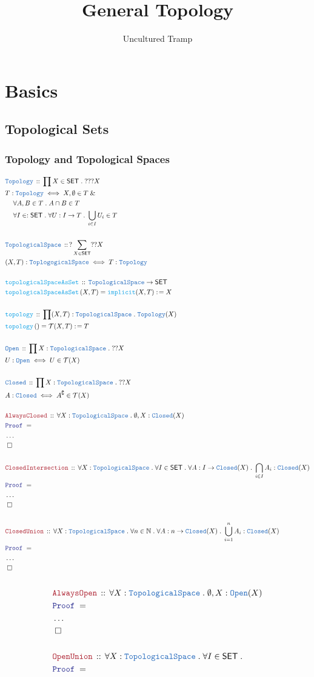 \documentclass[12pt]{scrartcl}
\author{Uncultured Tramp}
\title{General Topology}
\newcommand{\TYPE}[1]{\textcolor{NavyBlue}{\mathtt{#1}}}
\newcommand{\FUNC}[1]{\textcolor{Cerulean}{\mathtt{#1}}}
\newcommand{\LOGIC}[1]{\textcolor{Blue}{\mathtt{#1}}}
\newcommand{\THM}[1]{\textcolor{Maroon}{\mathtt{#1}}}
\renewcommand{\.}{\; . \;}
\newcommand{\de}{: \kern 0.1pc =}
\newcommand{\Act}[1]{\left( #1 \right)}
\newcommand{\Theorem}[2]{& \THM{#1} \, :: \, #2 \\ & \Proof = \\ }
\newcommand{\DeclareType}[2]{& \TYPE{#1} \, :: \, #2 \\}
\newcommand{\DefineType}[3]{& #1 : \TYPE{#2} \iff #3 \\}
\newcommand{\DeclareFunc}[2]{& \FUNC{#1} \, :: \, #2 \\}
\newcommand{\DefineNamedFunc}[4]{&  \FUNC{#1}\Act{#2} = #3 \de #4 \\}
\newcommand{\NewLine}{\\ & \kern 1pc}
\newcommand{\Page}[1]{ \begin{align*} #1 \end{align*}   }
\newcommand{\NoProof}{ & \ldots \\ \EndProof}
\renewcommand{\And}{\; \& \;}
\newcommand{\Nat}{\mathbb{N} }
\renewcommand{\c}{\complement}
\newcommand{\QED}{\; \square}
\newcommand{\EndProof}{& \QED \\}
\newcommand{\Proof}{\LOGIC{Proof} \; }
\newcommand{\SET}{\mathsf{SET}}
\newcommand{\TS}{\TYPE{TopologicalSpace}}
\newcommand{\T}{\mathcal{T}}
\begin{document}
\maketitle
\newpage
\tableofcontents
\newpage
\section{Basics}
\subsection{Topological Sets}
\subsubsection{Topology and Topological Spaces}
\Page{
	\DeclareType{Topology}
	{ \prod X \in \SET \. ???X }
	\DefineType{T}{Topology}{
		X, \emptyset \in T \And \NewLine
		\forall A,B \in T \. A \cap B \in T \NewLine
		\forall I \in :\SET \. \forall U : I \to T \. \bigcup_{i \in I} U_i \in T	}
	\\
	\DeclareType{TopologicalSpace}
	{
		?\sum_{X \in \SET} ??X
	}
	\DefineType{(X,T)}{ToplogogicalSpace}
	{
		T : \TYPE{Topology}
	}
	\\
	\DeclareFunc{topologicalSpaceAsSet}
	{
		\TS \to \SET           	
	}
	\DefineNamedFunc{topologicalSpaceAsSet}{X,T}{\FUNC{implicit}(X,T)}{X}
	\\
	\DeclareFunc{topology}{ \prod (X,T) : \TS \. \TYPE{Topology}(X)  }
	\DefineNamedFunc{topology}{}{\T(X,T)}{T}
	\\
	\DeclareType{Open}{\prod X : \TS \. ??X}
	\DefineType{U}{Open}{U \in \T(X)} 	
	\\
	\DeclareType{Closed}{\prod X : \TS \. ??X}
	\DefineType{A}{Closed}{A^\c \in \T(X)}
	\\
	\Theorem{AlwaysClosed}
	{
		\forall X : \TS \.
		\emptyset,X : \TYPE{Closed}(X)
	}
	\NoProof
	\\
	\Theorem{ClosedIntersection}
	{
		\forall X : \TS \.
		\forall I \in \SET \.
		\forall A : I \to \TYPE{Closed}(X) \.
		\bigcap_{i \in I} A_i : \TYPE{Closed}(X) 
	}	
	\NoProof
	\\
	\Theorem{ClosedUnion}
	{
		\forall X : \TS \.
		\forall n \in \Nat \.
		\forall A : n \to \TYPE{Closed}(X) \.
		\bigcup^n_{i = 1} A_i : \TYPE{Closed}(X) 
	}
	\NoProof
	\\
}\Page{
	\Theorem{AlwaysOpen}
	{
		\forall X : \TS \.
		\emptyset,X : \TYPE{Open}(X)
	}
	\NoProof
	\\
	\Theorem{OpenUnion}
	{
		\forall X : \TS \.
		\forall I \in \SET \.
}}
\end{document}
